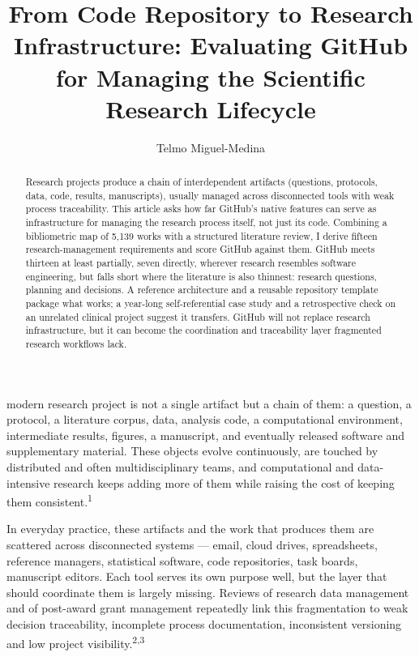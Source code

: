 \documentclass{IEEEcsmag}
\begin{document}

\title{From Code Repository to Research Infrastructure: Evaluating GitHub for Managing the Scientific Research Lifecycle}

\author{Telmo Miguel-Medina}


\begin{abstract}
Research projects produce a chain of interdependent artifacts (questions, protocols, data, code, results, manuscripts), usually managed across disconnected tools with weak process traceability. This article asks how far GitHub's native features can serve as infrastructure for managing the research process itself, not just its code. Combining a bibliometric map of 5{,}139 works with a structured literature review, I derive fifteen research-management requirements and score GitHub against them. GitHub meets thirteen at least partially, seven directly, wherever research resembles software engineering, but falls short where the literature is also thinnest: research questions, planning and decisions. A reference architecture and a reusable repository template package what works; a year-long self-referential case study and a retrospective check on an unrelated clinical project suggest it transfers. GitHub will not replace research infrastructure, but it can become the coordination and traceability layer fragmented research workflows lack.
\end{abstract}

\maketitle

 modern research project is not a single artifact but a chain of them: a question, a protocol, a literature corpus, data, analysis code, a computational environment, intermediate results, figures, a manuscript, and eventually released software and supplementary material. These objects evolve continuously, are touched by distributed and often multidisciplinary teams, and computational and data-intensive research keeps adding more of them while raising the cost of keeping them consistent.\textsuperscript{1}

In everyday practice, these artifacts and the work that produces them are scattered across disconnected systems --- email, cloud drives, spreadsheets, reference managers, statistical software, code repositories, task boards, manuscript editors. Each tool serves its own purpose well, but the layer that should coordinate them is largely missing. Reviews of research data management and of post-award grant management repeatedly link this fragmentation to weak decision traceability, incomplete process documentation, inconsistent versioning and low project visibility.\textsuperscript{2,3}
\end{document}
